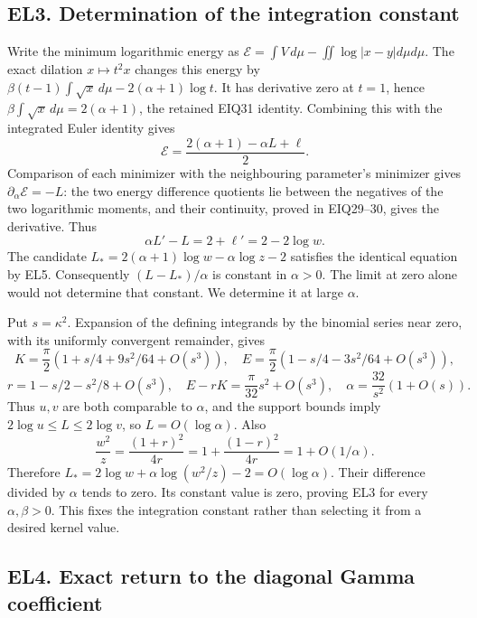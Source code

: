 \documentclass[10pt]{article}
\begin{document}
\subsection{EL3. Determination of the integration constant}\label{el3.-determination-of-the-integration-constant}

Write the minimum logarithmic energy as \(\mathcal E=\int V\,d\mu-\iint\log|x-y|d\mu d\mu\). The exact dilation \(x\mapsto t^2x\) changes this energy by \(\beta(t-1)\int\sqrt{x}\,d\mu-2(\alpha+1)\log t\). It has derivative zero at \(t=1\), hence \(\beta\int\sqrt{x}\,d\mu=2(\alpha+1)\), the retained EIQ31 identity. Combining this with the integrated Euler identity gives \[
 \mathcal E=\frac{2(\alpha+1)-\alpha L+\ell}{2}.
\] Comparison of each minimizer with the neighbouring parameter's minimizer gives \(\partial_\alpha\mathcal E=-L\): the two energy difference quotients lie between the negatives of the two logarithmic moments, and their continuity, proved in EIQ29--30, gives the derivative. Thus \[
 \alpha L'-L=2+\ell'=2-2\log w.
 \tag{EL9}
\] The candidate \(L_*=2(\alpha+1)\log w-\alpha\log z-2\) satisfies the identical equation by EL5. Consequently \((L-L_*)/\alpha\) is constant in \(\alpha>0\). The limit at zero alone would not determine that constant. We determine it at large \(\alpha\).

Put \(s=\kappa^2\). Expansion of the defining integrands by the binomial series near zero, with its uniformly convergent remainder, gives \[
 K=\frac\pi2(1+s/4+9s^2/64+O(s^3)),\quad
 E=\frac\pi2(1-s/4-3s^2/64+O(s^3)),
\] \[
 r=1-s/2-s^2/8+O(s^3),\quad
 E-rK=\frac\pi{32}s^2+O(s^3),\quad
 \alpha=\frac{32}{s^2}(1+O(s)).
 \tag{EL10}
\] Thus \(u,v\) are both comparable to \(\alpha\), and the support bounds imply \(2\log u\le L\le2\log v\), so \(L=O(\log\alpha)\). Also \[
 \frac{w^2}{z}=\frac{(1+r)^2}{4r}
 =1+\frac{(1-r)^2}{4r}=1+O(1/\alpha).
\] Therefore \(L_*=2\log w+\alpha\log(w^2/z)-2=O(\log\alpha)\). Their difference divided by \(\alpha\) tends to zero. Its constant value is zero, proving EL3 for every \(\alpha,\beta>0\). This fixes the integration constant rather than selecting it from a desired kernel value.

\subsection{EL4. Exact return to the diagonal Gamma coefficient}\label{el4.-exact-return-to-the-diagonal-gamma-coefficient}
\end{document}
